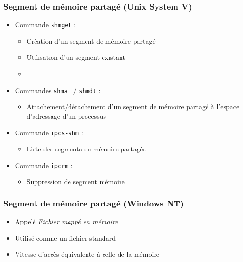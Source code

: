 \begin{frame}
\frametitle{Segment de mémoire partagé (Unix System V)}
\begin{itemize}
\item Commande \texttt{shmget} :
\begin{itemize}
\item Création d’un segment de mémoire partagé
\item Utilisation d’un segment existant
\item 
\end{itemize}
\item Commandes \texttt{shmat} / \texttt{shmdt} :
\begin{itemize}
\item Attachement/détachement d’un segment de mémoire partagé à l'espace d'adressage d'un processus
\end{itemize}
\item Commande \texttt{ipcs-shm} :
\begin{itemize}
\item Liste des segments de mémoire partagés
\end{itemize}
\item Commande \texttt{ipcrm} :
\begin{itemize}
\item Suppression de segment mémoire
\end{itemize}
\end{itemize}
\end{frame}

\begin{frame}
\frametitle{Segment de mémoire partagé (Windows NT)}
\begin{itemize}
\item Appelé \textit{Fichier mappé en mémoire}
\item Utilisé comme un fichier standard
\item Vitesse d’accès équivalente à celle de la mémoire
\end{itemize}
\end{frame}


